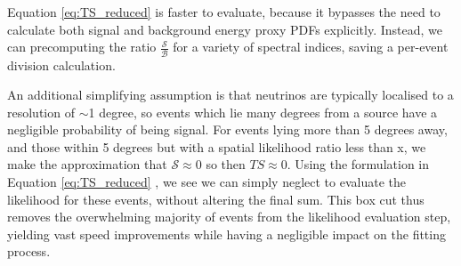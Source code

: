 Equation \ref{eq:TS_reduced}  is faster to evaluate, because it bypasses the need to calculate both signal and background energy proxy PDFs explicitly. Instead, we can precomputing the ratio $\frac{\mathcal{S}}{\mathcal{B}}$ for a variety of spectral indices, saving a per-event division calculation.

An additional simplifying assumption is that neutrinos are typically localised to a resolution of $\sim$1 degree, so events which lie many degrees from a source have a negligible probability of being signal. For events lying more than 5 degrees away, and those within 5 degrees but with a spatial likelihood ratio less than x, we make the approximation that $\mathcal{S} \approx 0$ so then $TS \approx 0$. Using the formulation in Equation \ref{eq:TS_reduced} , we see we can simply neglect to evaluate the likelihood for these events, without altering the final sum. This box cut thus removes the overwhelming majority of events from the likelihood evaluation step, yielding vast speed improvements while having a negligible impact on the fitting process.
